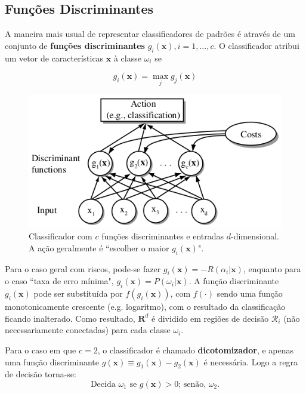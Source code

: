 \documentclass[a4paper,12pt,twocolumn]{article}
\begin{document}
\subsection{Funções Discriminantes}

A maneira mais usual de representar classificadores de padrões é através de um conjunto de \textbf{funções discriminantes} $g_i(\boldsymbol{x}), i = 1, ..., c$. O classificador atribui um vetor de características $\boldsymbol{x}$ à classe $\omega_i$ se

\begin{equation}
    g_i(\boldsymbol{x}) = \max_j g_j(\boldsymbol{x})
    \label{eq:discriminant_functions}
\end{equation}

\begin{figure}[ht]
    \centering
    \includegraphics[scale=0.45]{discriminant_functions}
    \caption{Classificador com $c$ funções discriminantes e entradas $d$-dimensional. A ação geralmente é ``escolher o maior $g_i(\boldsymbol{x})$".}
    \label{fig:discriminant_functions}
\end{figure}

Para o caso geral com riscos, pode-se fazer $g_i(\boldsymbol{x}) = - R(\alpha_i|\boldsymbol{x})$, enquanto para o caso ``taxa de erro mínima", $g_i(\boldsymbol{x}) = P(\omega_i|\boldsymbol{x})$. A função discriminante $g_i(\boldsymbol{x})$ pode ser substituída por $f(g_i(\boldsymbol{x}))$, com $f(\cdot)$ sendo uma função monotonicamente crescente (e.g. logaritmo), com o resultado da classificação ficando inalterado. Como resultado, $\boldsymbol{R}^d$ é dividido em regiões de decisão $\mathcal{R}_i$ (não necessariamente conectadas) para cada classe $\omega_i$.

Para o caso em que $c = 2$, o classificador é chamado \textbf{dicotomizador}, e apenas uma função discriminante $g(\boldsymbol{x}) \equiv g_1(\boldsymbol{x}) - g_2(\boldsymbol{x})$ é necessária. Logo a regra de decisão torna-se:
\begin{equation}
    \text{Decida } \omega_1 \text{ se } g(\boldsymbol{x}) > 0 \text {; senão, } \omega_2.
    \label{eq:decision_4}
\end{equation}
\end{document}
